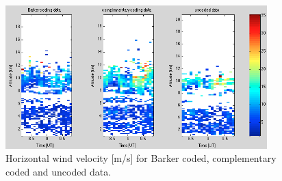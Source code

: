 \documentclass{article}
\begin{document}
\begin{figure}[t!]
\centering
\includegraphics[width=0.9\textwidth]{Figures/velocity.png}
\caption{Horizontal wind velocity [m/s] for Barker coded, complementary coded and uncoded data.}
\label{fig:velocity}
\end{figure}
\end{document}

